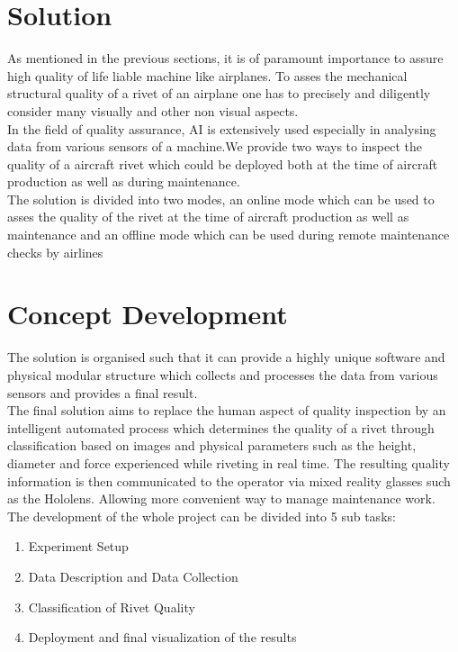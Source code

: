 \documentclass{article}
\begin{document}
\section{Solution}

As mentioned in the previous sections, it is of paramount importance to assure high quality of life liable machine like airplanes. To asses the mechanical structural quality of a rivet of an airplane one has to precisely and diligently consider many visually and other non visual aspects.\\

In  the  field  of  quality  assurance,  AI  is  extensively  used especially in analysing data from various sensors of a machine.We provide two ways to inspect the quality of a aircraft rivet which could be deployed both at the time of aircraft production as well as during maintenance.\\


The solution is divided into two  modes,  an  online  mode  which  can be  used  to  asses  the quality  of  the  rivet  at  the  time  of  aircraft  production  as  well as maintenance and an offline mode which can be used during remote maintenance checks by airlines
    

\section{Concept Development}

The solution is organised such that it can provide a highly unique software and physical modular structure which collects and processes the data from various sensors and provides a final result.\\

The final solution aims to replace the human aspect of quality inspection by an intelligent automated process which determines the quality of a rivet through classification based on images and physical parameters such as the height, diameter and force experienced while riveting in real time. The resulting quality information is then communicated to the operator via mixed reality glasses such as the Hololens. Allowing more convenient way to manage maintenance work. The development of the whole project can be divided into 5 sub tasks:

\begin{enumerate}
\item Experiment Setup
\item Data Description and Data Collection
\item Classification of Rivet Quality 
\item Deployment and final visualization of the results

\end{enumerate}
\end{document}
